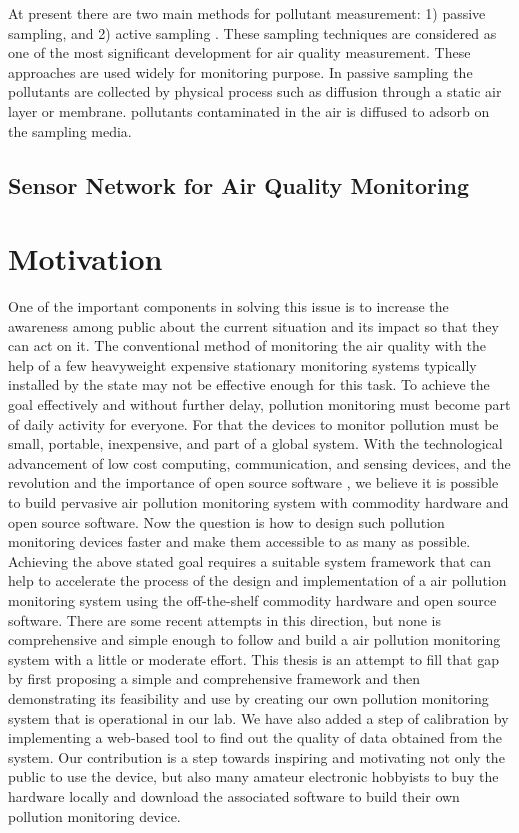 At present there are two main methods for pollutant measurement: 1) passive sampling, and 2) active sampling \cite{Balakrishnan2015} \cite{activepassive}. These sampling techniques are considered as one of the most significant development for air quality measurement. These approaches are used widely for monitoring purpose. In passive sampling the pollutants are collected by physical process such as diffusion through a static air layer or membrane. pollutants contaminated in the air is diffused to adsorb on the sampling media.

\subsection{Sensor Network for Air Quality Monitoring}







\section{Motivation}

One of the important components in solving this issue is to increase the awareness among public about the current situation and its impact so that they can act on it. The conventional method of monitoring the air quality with the help of a few heavyweight expensive stationary monitoring systems typically installed by the state may not be effective enough for this task. To achieve the goal effectively and without further delay, pollution monitoring must become part of daily activity for everyone. For that the devices to monitor pollution must be small, portable, inexpensive, and part of a global system. With the technological advancement of low cost computing, communication, and sensing devices, and the revolution and the importance of open source software \cite{Anthes2016}, we believe it is possible to build pervasive air pollution monitoring system with commodity hardware and open source software. Now the question is how to design such pollution monitoring devices faster and make them accessible to as many as possible. 
\\
Achieving the above stated goal requires a suitable system framework that can help to accelerate the process of the design and implementation of a air pollution monitoring system using the off-the-shelf commodity hardware and open source software. There are some recent attempts in this direction, but none is comprehensive and simple enough to follow and build a air pollution monitoring system with a little or moderate effort. This thesis is an attempt to fill that gap by first proposing a simple and comprehensive framework and then demonstrating its feasibility and use by creating our own pollution monitoring system that is operational in our lab. We have also added a step of calibration by implementing a web-based tool to find out the quality of data obtained from the system. Our contribution is a step towards inspiring and motivating not only the public to use the device, but also many amateur electronic hobbyists to buy the hardware locally and download the associated software to build their own pollution monitoring device.


